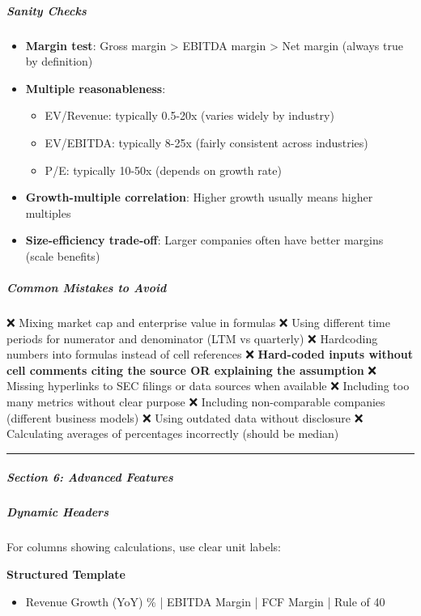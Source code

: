 \documentclass[11pt]{article}
\begin{document}
\subparagraph{Sanity Checks}\mbox{}\par
\begin{itemize}[leftmargin=*,itemsep=2pt,topsep=2pt]
\item {} \textbf{Margin test}: Gross margin > EBITDA margin > Net margin (always true by definition)
\item {} \textbf{Multiple reasonableness}:
\begin{itemize}[leftmargin=*,itemsep=2pt,topsep=2pt]
\item {} EV/Revenue: typically 0.5-20x (varies widely by industry)
\item {} EV/EBITDA: typically 8-25x (fairly consistent across industries)
\item {} P/E: typically 10-50x (depends on growth rate)
\end{itemize}
\item {} \textbf{Growth-multiple correlation}: Higher growth usually means higher multiples
\item {} \textbf{Size-efficiency trade-off}: Larger companies often have better margins (scale benefits)
\end{itemize}

\subparagraph{Common Mistakes to Avoid}\mbox{}\par
❌ Mixing market cap and enterprise value in formulas ❌ Using different time periods for numerator and denominator (LTM vs quarterly) ❌ Hardcoding numbers into formulas instead of cell references ❌ \textbf{Hard-coded inputs without cell comments citing the source OR explaining the assumption} ❌ Missing hyperlinks to SEC filings or data sources when available ❌ Including too many metrics without clear purpose ❌ Including non-comparable companies (different business models) ❌ Using outdated data without disclosure ❌ Calculating averages of percentages incorrectly (should be median)


\vspace{0.5em}\hrule\vspace{0.5em}

\subparagraph{Section 6: Advanced Features}\mbox{}\par

\subparagraph{Dynamic Headers}\mbox{}\par
For columns showing calculations, use clear unit labels:

\textbf{Structured Template}
\begin{itemize}[leftmargin=*,itemsep=2pt,topsep=2pt]
\item {} Revenue Growth (YoY) \% | EBITDA Margin | FCF Margin | Rule of 40
\end{itemize}
\end{document}
